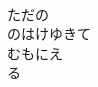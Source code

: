 \documentclass[10pt,b5j]{tarticle} %
\begin{document}
\begin{enumerate}
\begin{minipage}[c]{\blocksize}
    \end{minipage}
    \begin{minipage}[c]{\blocksize}
        
        \vspace{\linespace}
        \item~\\
        ただの\\
        のはけゆきて\\
        むもにえ\\
        る
    
    \end{minipage}
\end{enumerate} %
\end{document}
